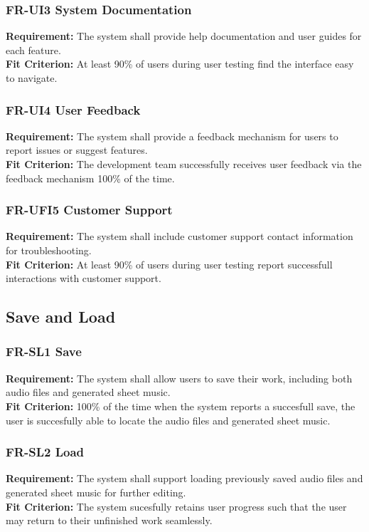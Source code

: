 \documentclass[12pt]{article}
\begin{document}
\subsubsection*{FR-UI3 System Documentation}
\textbf{Requirement:} The system shall provide help documentation and user guides for each feature. \\
\textbf{Fit Criterion:} At least 90\% of users during user testing find the interface easy to navigate.
\subsubsection*{FR-UI4 User Feedback}
\textbf{Requirement:} The system shall provide a feedback mechanism for users to report issues or suggest features. \\
\textbf{Fit Criterion:} The development team successfully receives user feedback via the feedback mechanism 100\% of the time.
\subsubsection*{FR-UFI5 Customer Support}
\textbf{Requirement:} The system shall include customer support contact information for troubleshooting. \\
\textbf{Fit Criterion:} At least 90\% of users during user testing report successfull interactions with customer support.

\subsection{Save and Load}
\subsubsection*{FR-SL1 Save}
\textbf{Requirement:} The system shall allow users to save their work, including both audio files and generated sheet music. \\
\textbf{Fit Criterion:} 100\% of the time when the system reports a succesfull save, the user is succesfully able to locate the audio files and generated sheet music.
\subsubsection*{FR-SL2 Load}
\textbf{Requirement:} The system shall support loading previously saved audio files and generated sheet music for further editing. \\
\textbf{Fit Criterion:} The system sucesfully retains user progress such that the user may return to their unfinished work seamlessly.
\end{document}
